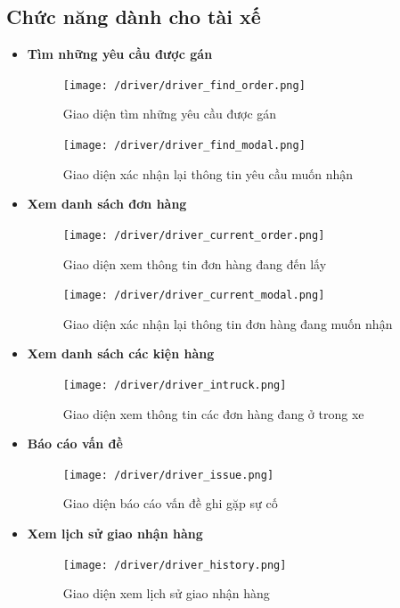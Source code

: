 \subsection{Chức năng dành cho tài xế}
\begin{itemize}
	\item \textbf{Tìm những yêu cầu được gán}
	\begin{figure}[H]
		\texttt{[image: /driver/driver\_find\_order.png]}
		\centering
		\caption{Giao diện tìm những yêu cầu được gán}
	\end{figure}
	
	\begin{figure}[H]
		\texttt{[image: /driver/driver\_find\_modal.png]}
		\centering
		\caption{Giao diện xác nhận lại thông tin yêu cầu muốn nhận}
	\end{figure}
	
	
	\item \textbf{Xem danh sách đơn hàng}
	\begin{figure}[H]
		\texttt{[image: /driver/driver\_current\_order.png]}
		\centering
		\caption{Giao diện xem thông tin đơn hàng đang đến lấy}
	\end{figure}
	
	\begin{figure}[H]
		\texttt{[image: /driver/driver\_current\_modal.png]}
		\centering
		\caption{Giao diện xác nhận lại thông tin đơn hàng đang muốn nhận}
	\end{figure}


	
	\item \textbf{Xem danh sách các kiện hàng}
	\begin{figure}[H]
		\texttt{[image: /driver/driver\_intruck.png]}
		\centering
		\caption{Giao diện xem thông tin các đơn hàng đang ở trong xe}
	\end{figure}
	
	\item \textbf{Báo cáo vấn đề}
	
	\begin{figure}[H]
		\texttt{[image: /driver/driver\_issue.png]}
		\centering
		\caption{Giao diện báo cáo vấn đề ghi gặp sự cố}
	\end{figure}


	\item \textbf{Xem lịch sử giao nhận hàng}
	
	\begin{figure}[H]
		\texttt{[image: /driver/driver\_history.png]}
		\centering
		\caption{Giao diện xem lịch sử giao nhận hàng}
	\end{figure}
	
\end{itemize}





